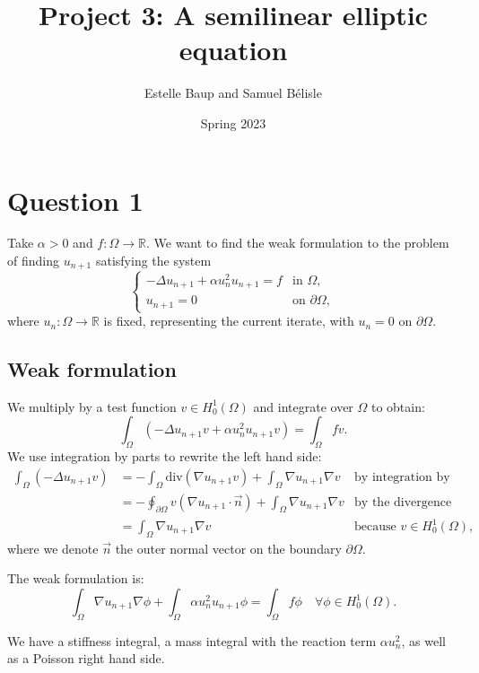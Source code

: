 \documentclass[11pt, a4paper, twoside]{article}
\newcommand{\R}{\mathbb{R}} %
\newcommand{\grad}{\nabla} %
\renewcommand{\div}{\text{div}} %
\newcommand{\Hunz}{H^1_0(\Omega)}
\newcommand{\intom}{\int_\Omega}
\newcommand{\intbd}{\oint_{\partial \Omega}}
\begin{document}
\title{Project 3: A semilinear elliptic equation}
\author{Estelle Baup and Samuel Bélisle}
\date{Spring 2023}
\maketitle 

\section*{Question 1}
Take $\alpha > 0$ and $f : \Omega \to \R$.
We want to find the weak formulation to the problem of finding $u_{n+1}$ satisfying the system
$$\begin{cases}  - \Delta u_{n+1} + \alpha u_n^2 u_{n+1} = f & \text{in } \Omega,\\
u_{n+1} = 0 &\text{on } \partial\Omega,
\end{cases}$$
where $u_n : \Omega \to \R$ is fixed, representing the current iterate, with $u_n = 0$ on $\partial\Omega$.

\subsection*{Weak formulation}
We multiply by a test function $v\in \Hunz$ and integrate over $\Omega$ to obtain:
$$\intom \left( -\Delta u_{n+1} v + \alpha u_n^2 u_{n+1} v \right) = \intom fv .$$
We use integration by parts to rewrite the left hand side:
\begin{align*}
 \intom (-\Delta u_{n+1} v)
 &= - \intom \div(\grad u_{n+1} v) + \intom \grad u_{n+1} \grad v
 	&\text{by integration by part}
 \\%
 &= - \intbd v (\grad u_{n+1} \cdot \vec n) + \intom \grad u_{n+1} \grad v
 	&\text{by the divergence theorem}
 \\%
 &=  \intom \grad u_{n+1} \grad v
 	&\text{because } v\in\Hunz,
\end{align*}
where we denote $\vec n$ the outer normal vector on the boundary $\partial \Omega$.

The weak formulation is:
\begin{equation}
\label{weak_f} \tag{E1}
\intom
\grad u_{n+1} \grad \phi
+ 
\intom
\alpha u_n^2 u_{n+1} \phi
= \intom f\phi
\quad \forall \phi \in\Hunz.
\end{equation}

We have a stiffness integral, a mass integral with the reaction term $\alpha u_n^2$, as well as a Poisson right hand side.
\end{document}
